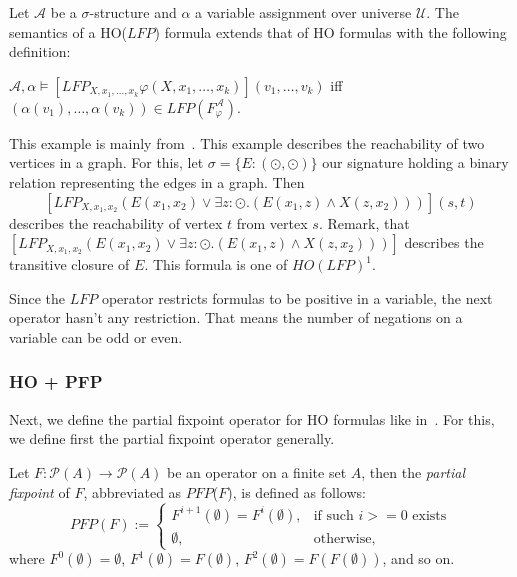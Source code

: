 \begin{definition}
    Let $\mathcal{A}$ be a $\sigma$-structure and $\alpha$ a variable assignment over universe $\mathcal{U}$. The
    semantics of a HO($\mathit{LFP}$) formula extends that of HO formulas with the following definition:
    \begin{compactitem}
        \item $\mathcal{A}, \alpha \models [\mathit{LFP}_{X, x_1, \dots, x_k}\varphi(X, x_1, \dots, x_k)](v_1, \dots,
        v_k)$ iff $(\alpha(v_1), \dots, \alpha(v_k)) \in \mathit{LFP}(F_\varphi^\mathcal{A})$.
    \end{compactitem}
\end{definition}

\begin{example}
    \label{example:ho_lfp}
    This example is mainly from~\cite{freireMartins2011descriptive}. This example describes the reachability of two
    vertices in a graph. For this, let $\sigma = \{E:(\odot, \odot)\}$ our signature holding a binary relation
    representing the edges in a graph. Then
    \[[LFP_{X, x_1, x_2}(E(x_1, x_2) \vee \exists z:\odot.(E(x_1, z) \wedge X(z, x_2)))](s, t)\]
    describes the reachability of vertex $t$ from vertex $s$. Remark, that $[LFP_{X, x_1, x_2}(E(x_1, x_2) \vee
    \exists z:\odot.(E(x_1, z) \wedge X(z, x_2)))]$ describes the transitive closure of $E$. This formula is one of
    $HO(LFP)^1$.
\end{example}

Since the $\mathit{LFP}$ operator restricts formulas to be positive in a variable, the next operator hasn't any
restriction. That means the number of negations on a variable can be odd or even.

\subsubsection{HO + PFP}

Next, we define the partial fixpoint operator for HO formulas like in~\cite{schewe2006fixpoint}. For this, we define
first the partial fixpoint operator generally.

\begin{definition}
    Let $F: \mathscr{P}(A) \rightarrow \mathscr{P}(A)$ be an operator on a finite set $A$, then the \emph{partial
    fixpoint} of $F$, abbreviated as $\mathit{PFP}$($F$), is defined as follows:
    \[\mathit{PFP}(F):=\begin{cases}
               F^{i+1}(\emptyset)=F^i(\emptyset),  & \text{if such } i >= 0 \text{ exists}\\
               \emptyset, & \text{otherwise,}
    \end{cases}\]
    where $F^0(\emptyset) = \emptyset$, $F^1(\emptyset) = F(\emptyset)$, $F^2(\emptyset) = F(F(\emptyset))$, and so on.
\end{definition}

